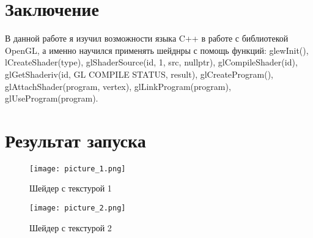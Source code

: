 \documentclass[a4paper, 14pt]{extarticle}
\begin{document}
\section{Заключение}

    В данной работе я изучил возможности языка C++ в работе с библиотекой OpenGL, а именно научился применять шейднры с помощь функций: glewInit(), lCreateShader(type), glShaderSource(id, 1, src, nullptr), glCompileShader(id), glGetShaderiv(id, GL COMPILE STATUS, result), glCreateProgram(), glAttachShader(program, vertex), glLinkProgram(program), glUseProgram(program).

\section{Результат запуска}
    
\begin{figure}[!htb]
	\centering
	\texttt{[image: picture\_1.png]}
\caption{Шейдер с текстурой 1}
\label{fig:picture_1.png}
\end{figure}

\begin{figure}[!htb]
	\centering
	\texttt{[image: picture\_2.png]}
\caption{Шейдер с текстурой 2}
\label{fig:picture_2.png}
\end{figure}
\end{document}
